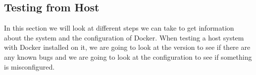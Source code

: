 \subsection{Testing from Host}
In this section we will look at different steps we can take to get information about the system and the configuration of Docker. When testing a host system with Docker installed on it, we are going to look at the version to see if there are any known bugs and we are going to look at the configuration to see if something is misconfigured.






